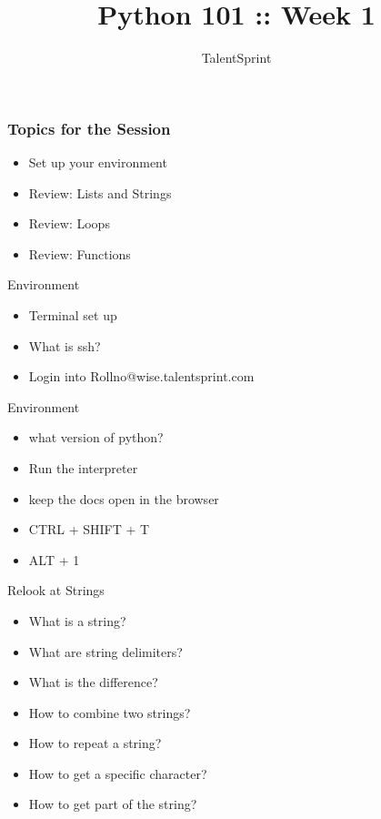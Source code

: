 \documentclass[14pt]{beamer}
\title{Python 101 :: Week 1}
\date{}
\author[TS]{TalentSprint}
\begin{document}
\begin{frame}
  \titlepage
\end{frame}
    
\begin{frame}
  \frametitle{Topics for the Session}
  \begin{itemize}
  \item Set up your environment
  \item Review: Lists and Strings
  \item Review: Loops
  \item Review: Functions
  \end{itemize}
\end{frame}
\begin{frame}{Environment}
  \begin{itemize}
      \item Terminal set up
      \pause
      \item What is ssh?
      \pause
      \item Login into Rollno@wise.talentsprint.com
  \end{itemize}
\end{frame}
\begin{frame}{Environment}
  \begin{itemize}
  \item what version of python?
	  \pause
  \item Run the interpreter
  \item keep the docs open in the browser
  \item CTRL + SHIFT + T
  \item ALT + 1
  \end{itemize}
\end{frame}

\begin{frame}{Relook at Strings}
  \begin{itemize}
  \item What is a string?
    \pause
  \item What are string delimiters?
    \pause
  \item What is the difference?
    \pause
  \item How to combine two strings?
    \pause
  \item How to repeat a string?
    \pause
  \item How to get a specific character? 
	  \pause
  \item How to get part of the string?
  \end{itemize}
\end{frame}
    
\end{document}
